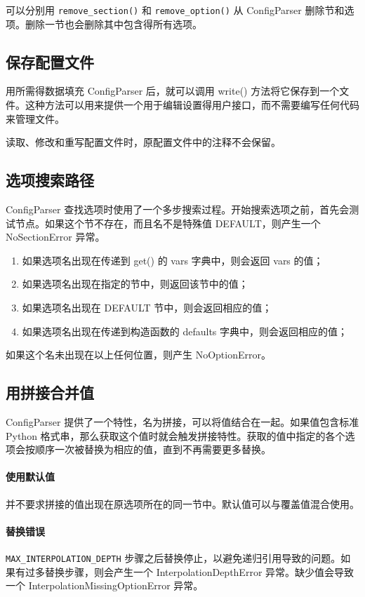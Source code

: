 可以分别用 \verb|remove_section()| 和 \verb|remove_option()| 从 ConfigParser 删除节和选项。删除一节也会删除其中包含得所有选项。

\subsection{保存配置文件}
用所需得数据填充 ConfigParser 后，就可以调用 write() 方法将它保存到一个文件。这种方法可以用来提供一个用于编辑设置得用户接口，而不需要编写任何代码来管理文件。

\begin{tcolorbox}[title=警告]
    读取、修改和重写配置文件时，原配置文件中的注释不会保留。
\end{tcolorbox}

\subsection{选项搜索路径}
ConfigParser 查找选项时使用了一个多步搜索过程。开始搜索选项之前，首先会测试节点。如果这个节不存在，而且名不是特殊值 DEFAULT，则产生一个 NoSectionError 异常。
\begin{enumerate}
    \item 如果选项名出现在传递到 get() 的 vars 字典中，则会返回 vars 的值；
    \item 如果选项名出现在指定的节中，则返回该节中的值；
    \item 如果选项名出现在 DEFAULT 节中，则会返回相应的值；
    \item 如果选项名出现在传递到构造函数的 defaults 字典中，则会返回相应的值；
\end{enumerate}
如果这个名未出现在以上任何位置，则产生 NoOptionError。

\subsection{用拼接合并值}
ConfigParser 提供了一个特性，名为拼接，可以将值结合在一起。如果值包含标准 Python 格式串，那么获取这个值时就会触发拼接特性。获取的值中指定的各个选项会按顺序一次被替换为相应的值，直到不再需要更多替换。

\paragraph{使用默认值} 并不要求拼接的值出现在原选项所在的同一节中。默认值可以与覆盖值混合使用。

\paragraph{替换错误} \verb|MAX_INTERPOLATION_DEPTH| 步骤之后替换停止，以避免递归引用导致的问题。如果有过多替换步骤，则会产生一个 InterpolationDepthError 异常。缺少值会导致一个 InterpolationMissingOptionError 异常。
